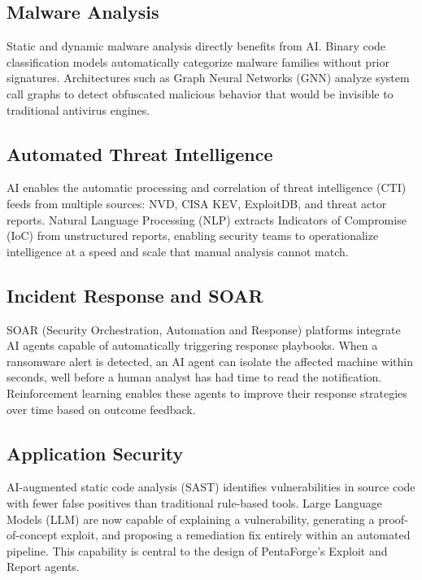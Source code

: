 \documentclass[12pt,a4paper]{report}
\begin{document}
\subsection{Malware Analysis}

Static and dynamic malware analysis directly benefits from AI. Binary code
classification models automatically categorize malware families without prior
signatures. Architectures such as Graph Neural Networks (GNN) analyze system call
graphs to detect obfuscated malicious behavior that would be invisible to
traditional antivirus engines.

\subsection{Automated Threat Intelligence}

AI enables the automatic processing and correlation of threat intelligence (CTI)
feeds from multiple sources: NVD, CISA KEV, ExploitDB, and threat actor reports.
Natural Language Processing (NLP) extracts Indicators of Compromise (IoC) from
unstructured reports, enabling security teams to operationalize intelligence at
a speed and scale that manual analysis cannot match.

\subsection{Incident Response and SOAR}

SOAR (Security Orchestration, Automation and Response) platforms integrate AI
agents capable of automatically triggering response playbooks. When a ransomware
alert is detected, an AI agent can isolate the affected machine within seconds,
well before a human analyst has had time to read the notification. Reinforcement
learning enables these agents to improve their response strategies over time based
on outcome feedback.

\subsection{Application Security}

AI-augmented static code analysis (SAST) identifies vulnerabilities in source code
with fewer false positives than traditional rule-based tools. Large Language Models
(LLM) are now capable of explaining a vulnerability, generating a proof-of-concept
exploit, and proposing a remediation fix entirely  within an automated pipeline. This
capability is central to the design of PentaForge's Exploit and Report agents.
\end{document}

